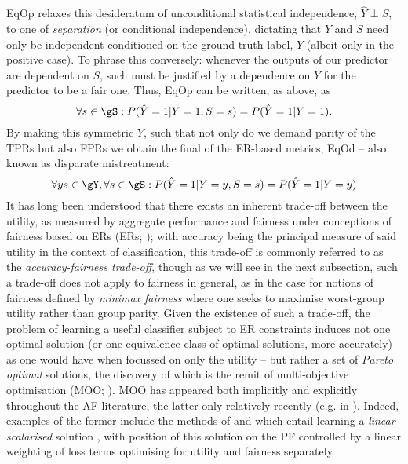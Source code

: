 %
%
\Acf{EqOp} relaxes this desideratum of unconditional statistical independence, \(\hat{Y} \perp S\),
to one of \emph{separation} (or conditional independence), dictating that \(\hat{Y}\) and \(S\)
need only be independent conditioned on the ground-truth label, \(Y\) (albeit only in the positive
case).
%
To phrase this conversely: whenever the outputs of our predictor are dependent on \(S\), such must be
justified by a dependence on \(Y\) for the predictor to be a fair one.
%
Thus, \ac{EqOp} can be written, as above, as
%
\begin{equation}
    \forall s \in \gS: P( \hat{Y}=1|Y=1, S=s ) = P(\hat{Y}=1|Y=1).
\end{equation}
%
%
By making this symmetric \wrt{} \(Y\), such that not only do we demand parity of the \acp{TPR} but
also \acp{FPR} we obtain the final of the \ac{ER}-based metrics, \ac{EqOd} \citep{hardt2016equality} --
also known as disparate mistreatment:
%
\begin{equation}
    \forall y s \in \gY, \forall s \in \gS: P( \hat{Y}=1|Y=y, S=s ) = P( \hat{Y}=1|Y=y )
\end{equation}
%
%
It has long been understood that there exists an inherent trade-off between the utility, as
measured by aggregate performance and fairness under conceptions of fairness based on \aclp{ER}
(\acsp{ER}; \citealp{kaplow1999conflict}); with accuracy being the principal measure of said
utility in the context of classification, this trade-off is commonly referred to as the
\emph{accuracy-fairness trade-off}, though as we will see in the next subsection, such a trade-off
does not apply to fairness in general, as in the case for notions of fairness defined by
\emph{minimax fairness} where one seeks to maximise worst-group utility rather than group parity.
%
Given the existence of such a trade-off, the problem of learning a useful classifier subject to
\ac{ER}
constraints induces not one optimal solution (or one equivalence class of optimal solutions, more
accurately) -- as one would have when focussed on only the utility -- but rather a set of
\emph{Pareto optimal} solutions, the discovery of which is the remit of multi-objective
optimisation (\ac{MOO}; \cite{sawaragi1985theory, deb2013multi}). 
%
MOO has appeared both implicitly and explicitly throughout the \ac{AF} literature, the latter only
relatively recently (e.g. in \cite{navon2020learning}). 
%
Indeed, examples of the former include the methods of \cite{louizos2015variational} and
\cite{madras2018learning} which entail learning a \emph{linear scalarised} solution
\citep{boyd2004convex},  with position of this solution on the \acf{PF} controlled by a linear
weighting of loss terms optimising for utility and fairness separately.
%
